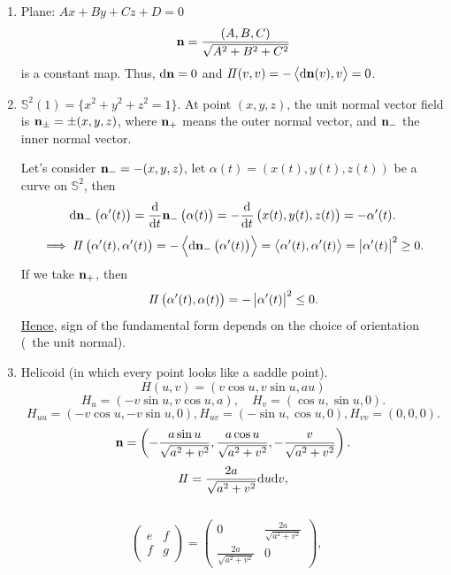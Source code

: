 \begin{example}
    \begin{enumerate}[(1)]
        \hfill
        \item Plane: \(Ax +B y+C z+D=0 \)
        \[\vb{n}=\frac{(A,B,C)}{\sqrt{A^2+B^2+C^2}}\]
        is a constant map. Thus, 
        \(
            \dd\vb{n}=0    
        \) and \(I\!I(v,v)=-\left\langle \dd\vb{n}(v),v\right\rangle=0\).
        \item \(\mathbb{S}^2(1)=\{x^2+y^2+z^2=1\}\).
        At point \((x,y,z)\), the unit normal vector field is 
        \(\vb{n}_{\pm}=\pm (x,y,z)\), where \(\vb{n}_+\) means 
        the outer normal vector, and \(\vb{n}_-\) the inner normal 
        vector.

        Let's consider \(\vb{n}_-=-(x,y,z)\), let \(\alpha(t)=\left(
        x(t),y(t),z(t)\right)\) be a curve on \(\mathbb{S}^2\), then 
        \[
            \dd\vb{n}_-\left(\alpha'(t)\right)
            =\dv{t}\vb{n}_- \left(\alpha(t)\right)
            =-\dv{t}\left(x(t),y(t),z(t)\right)
            =-\alpha'(t)    
        .\]
        \[\implies
            I\!I\left(\alpha'(t),\alpha'(t)\right)
            =-\left\langle \dd\vb{n}_-\left(\alpha'(t)\right)
            \right\rangle=\left\langle\alpha'(t),\alpha'(t)
            \right\rangle=\left|\alpha'(t)\right|^2\ge 0.
        \]
        If we take \(\vb{n}_+\), then 
        \[I\!I\left(\alpha'(t),\alpha(t)\right)=
        -\left|\alpha'(t)\right|^2\le 0.\]
        \underline{Hence}, sign of the  fundamental form
    depends on the choice of orientation (\ie\ the unit normal).
    \item Helicoid (in which every point looks like a saddle point).
    \[H(u,v)=(v\cos u,v\sin u,a u)\]
    \[H_u=(-v\sin u,v\cos u,a),\quad H_v=(\cos u,\sin u,0).\]
    \[H_{uu}=(-v\cos u,-v\sin u,0),H_{uv}=(-\sin u,\cos u,0),
    H_{vv}=(0,0,0).
    \]
    \[
        \vb{n}=\left(-\frac{a\sin u}{\sqrt{a^2+v^2}},
        \frac{a\cos u}{\sqrt{a^2+v^2}},
        -\frac{v}{\sqrt{a^2+v^2}}
        \right).    
    \]
    \[
        I\!I=\frac{2a}{\sqrt{a^2+v^2}}\dd u\dd v    ,
    \]
    \ie\ 
    \[
        \begin{pmatrix}
            e&f\\
            f&g
        \end{pmatrix}=\begin{pmatrix}
            0&\frac{2a}{\sqrt{a^2+v^2}}\\
            \frac{2a}{\sqrt{a^2+v^2}}&0
        \end{pmatrix},\quad
\]
\end{enumerate}
\end{example}
